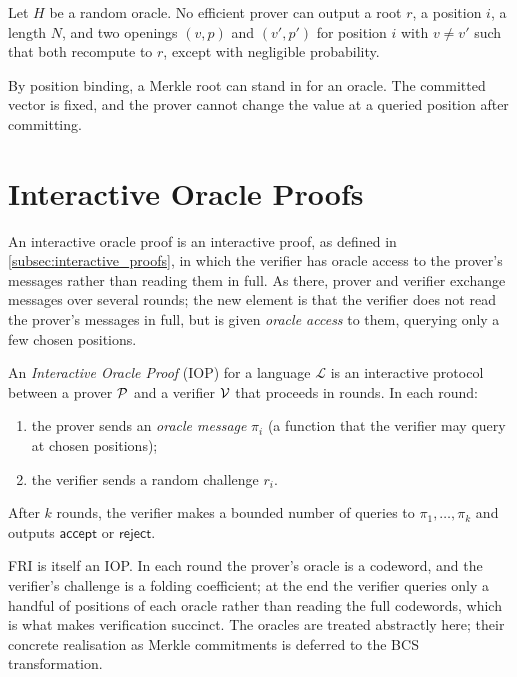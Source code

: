\begin{proposition}
\label{prop:position_binding}
Let $H$ be a random oracle. No efficient prover can output a root
$r$, a position $i$, a length $N$, and two openings $(v, p)$ and
$(v', p')$ for position $i$ with $v \neq v'$ such that both recompute to
$r$, except with negligible probability.
\end{proposition}
 
By position binding, a Merkle root can stand in for an oracle. The
committed vector is fixed, and the prover cannot change the value at a
queried position after committing.



\section{Interactive Oracle Proofs}
\label{sec:iop}

An interactive oracle proof is an interactive proof, as defined in 
\cref{subsec:interactive_proofs}, in which the verifier has oracle 
access to the prover’s messages rather than reading them in full.
As there, prover and verifier exchange
messages over several rounds; the new element is that the verifier does
not read the prover's messages in full, but is given \emph{oracle access}
to them, querying only a few chosen positions.

\begin{definition}
\label{def:iop}
An \emph{Interactive Oracle Proof} (IOP) for a language $\mathcal{L}$
is an interactive protocol between a prover $\mathcal{P}$ and a verifier
$\mathcal{V}$ that proceeds in rounds. In each round:
\begin{enumerate}
  \item the prover sends an \emph{oracle message} $\pi_i$ (a function
    that the verifier may query at chosen positions);
  \item the verifier sends a random challenge $r_i$.
\end{enumerate}
After $k$ rounds, the verifier makes a bounded number of queries to
$\pi_1, \ldots, \pi_k$ and outputs $\mathsf{accept}$ or
$\mathsf{reject}$.
\end{definition}

\begin{example}
\label{ex:iop}
FRI is itself an IOP. In each round the prover's oracle is a codeword,
and the verifier's challenge is a folding coefficient; at the end the
verifier queries only a handful of positions of each oracle rather than
reading the full codewords, which is what makes verification succinct.
The oracles are treated abstractly here; their concrete realisation as
Merkle commitments is deferred to the BCS transformation.
\end{example}

